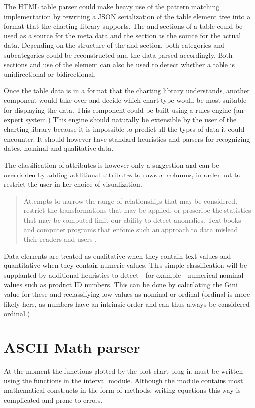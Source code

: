 The HTML table parser could make heavy use of the pattern matching implementation by rewriting a JSON serialization of the table element tree into a format that the charting library supports. The  and  sections of a table could be used as a source for the meta data and the  section as the source for the actual data. Depending on the structure of the  and  section, both categories and subcategories could be reconstructed and the data parsed accordingly. Both sections and use of the  element can also be used to detect whether a table is unidirectional or bidirectional.

Once the table data is in a format that the charting library understands, another component would take over and decide which chart type would be most suitable for displaying the data. This component could be built using a rules engine (an expert system.) This engine should naturally be extensible by the user of the charting library because it is impossible to predict all the types of data it could encounter. It should however have standard heuristics and parsers for recognizing dates, nominal and qualitative data.

The classification of attributes is however only a suggestion and can be overridden by adding additional  attributes to rows or columns, in order not to restrict the user in her choice of visualization.

\begin{quotation}
Attempts to narrow the range of relationships that may be considered, restrict the transformations that may be applied, or proscribe the statistics that may be computed limit our ability to detect anomalies. Text books and computer programs that enforce such an approach to data mislead their readers and users \cite{velleman93}.
\end{quotation}

Data elements are treated as qualitative when they contain text values and quantitative when they contain numeric values. This simple classification will be supplanted by additional heuristics to detect---for example---numerical nominal values such as product ID numbers. This can be done by calculating the Gini value for these and reclassifying low values as nominal or ordinal (ordinal is more likely here, as numbers have an intrinsic order and can thus always be considered ordinal.)

\section{ASCII Math parser}
At the moment the functions plotted by the plot chart plug-in must be written using the functions in the interval module. Although the module contains most mathematical constructs in the form of methods, writing equations this way is complicated and prone to errors.

